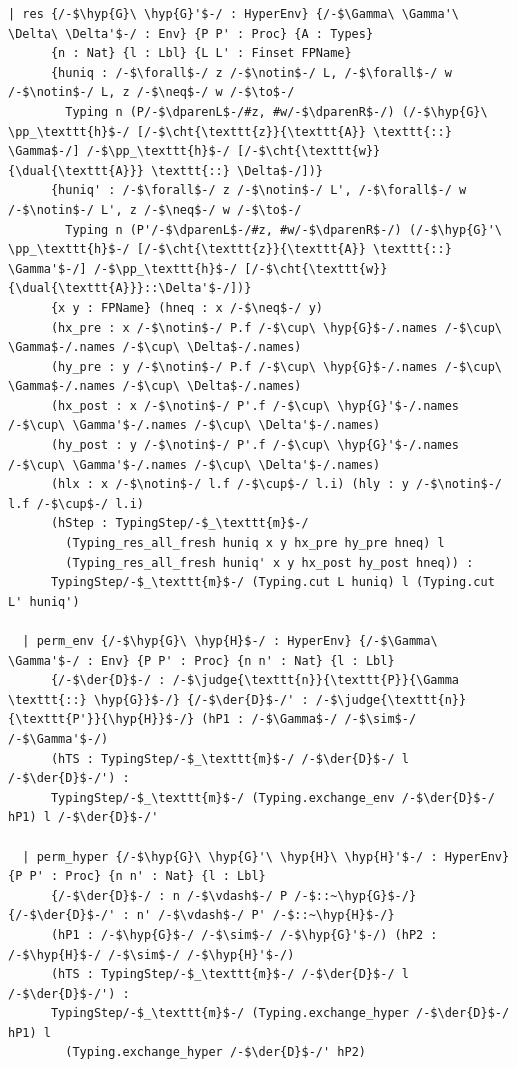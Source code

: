 \begin{lstlisting}[language=Lean4,
  caption={The typed transition relation \texttt{TypingStep}$_{\texttt{m}}$.},
  label={lst:app-typingstep}]
  | res {/-$\hyp{G}\ \hyp{G}'$-/ : HyperEnv} {/-$\Gamma\ \Gamma'\ \Delta\ \Delta'$-/ : Env} {P P' : Proc} {A : Types}
      {n : Nat} {l : Lbl} {L L' : Finset FPName}
      {huniq : /-$\forall$-/ z /-$\notin$-/ L, /-$\forall$-/ w /-$\notin$-/ L, z /-$\neq$-/ w /-$\to$-/
        Typing n (P/-$\dparenL$-/#z, #w/-$\dparenR$-/) (/-$\hyp{G}\ \pp_\texttt{h}$-/ [/-$\cht{\texttt{z}}{\texttt{A}} \texttt{::} \Gamma$-/] /-$\pp_\texttt{h}$-/ [/-$\cht{\texttt{w}}{\dual{\texttt{A}}} \texttt{::} \Delta$-/])}
      {huniq' : /-$\forall$-/ z /-$\notin$-/ L', /-$\forall$-/ w /-$\notin$-/ L', z /-$\neq$-/ w /-$\to$-/
        Typing n (P'/-$\dparenL$-/#z, #w/-$\dparenR$-/) (/-$\hyp{G}'\ \pp_\texttt{h}$-/ [/-$\cht{\texttt{z}}{\texttt{A}} \texttt{::} \Gamma'$-/] /-$\pp_\texttt{h}$-/ [/-$\cht{\texttt{w}}{\dual{\texttt{A}}}::\Delta'$-/])}
      {x y : FPName} (hneq : x /-$\neq$-/ y)
      (hx_pre : x /-$\notin$-/ P.f /-$\cup\ \hyp{G}$-/.names /-$\cup\ \Gamma$-/.names /-$\cup\ \Delta$-/.names)
      (hy_pre : y /-$\notin$-/ P.f /-$\cup\ \hyp{G}$-/.names /-$\cup\ \Gamma$-/.names /-$\cup\ \Delta$-/.names)
      (hx_post : x /-$\notin$-/ P'.f /-$\cup\ \hyp{G}'$-/.names /-$\cup\ \Gamma'$-/.names /-$\cup\ \Delta'$-/.names)
      (hy_post : y /-$\notin$-/ P'.f /-$\cup\ \hyp{G}'$-/.names /-$\cup\ \Gamma'$-/.names /-$\cup\ \Delta'$-/.names)
      (hlx : x /-$\notin$-/ l.f /-$\cup$-/ l.i) (hly : y /-$\notin$-/ l.f /-$\cup$-/ l.i)
      (hStep : TypingStep/-$_\texttt{m}$-/
        (Typing_res_all_fresh huniq x y hx_pre hy_pre hneq) l
        (Typing_res_all_fresh huniq' x y hx_post hy_post hneq)) :
      TypingStep/-$_\texttt{m}$-/ (Typing.cut L huniq) l (Typing.cut L' huniq')

  | perm_env {/-$\hyp{G}\ \hyp{H}$-/ : HyperEnv} {/-$\Gamma\ \Gamma'$-/ : Env} {P P' : Proc} {n n' : Nat} {l : Lbl}
      {/-$\der{D}$-/ : /-$\judge{\texttt{n}}{\texttt{P}}{\Gamma \texttt{::} \hyp{G}}$-/} {/-$\der{D}$-/' : /-$\judge{\texttt{n}}{\texttt{P'}}{\hyp{H}}$-/} (hP1 : /-$\Gamma$-/ /-$\sim$-/ /-$\Gamma'$-/)
      (hTS : TypingStep/-$_\texttt{m}$-/ /-$\der{D}$-/ l /-$\der{D}$-/') :
      TypingStep/-$_\texttt{m}$-/ (Typing.exchange_env /-$\der{D}$-/ hP1) l /-$\der{D}$-/'

  | perm_hyper {/-$\hyp{G}\ \hyp{G}'\ \hyp{H}\ \hyp{H}'$-/ : HyperEnv} {P P' : Proc} {n n' : Nat} {l : Lbl}
      {/-$\der{D}$-/ : n /-$\vdash$-/ P /-$::~\hyp{G}$-/} {/-$\der{D}$-/' : n' /-$\vdash$-/ P' /-$::~\hyp{H}$-/}
      (hP1 : /-$\hyp{G}$-/ /-$\sim$-/ /-$\hyp{G}'$-/) (hP2 : /-$\hyp{H}$-/ /-$\sim$-/ /-$\hyp{H}'$-/)
      (hTS : TypingStep/-$_\texttt{m}$-/ /-$\der{D}$-/ l /-$\der{D}$-/') :
      TypingStep/-$_\texttt{m}$-/ (Typing.exchange_hyper /-$\der{D}$-/ hP1) l
        (Typing.exchange_hyper /-$\der{D}$-/' hP2)
\end{lstlisting}

